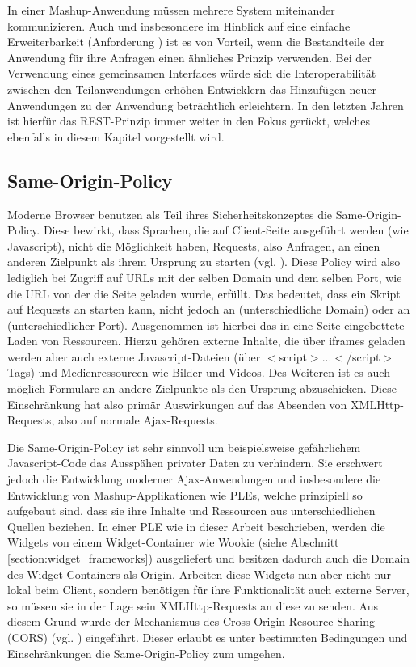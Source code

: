 In einer Mashup-Anwendung müssen mehrere System miteinander kommunizieren. Auch und insbesondere im Hinblick auf eine einfache Erweiterbarkeit (Anforderung ) ist es von Vorteil, wenn die Bestandteile der Anwendung für ihre Anfragen einen ähnliches Prinzip verwenden. Bei der Verwendung eines gemeinsamen Interfaces würde sich die Interoperabilität zwischen den Teilanwendungen erhöhen Entwicklern das Hinzufügen neuer Anwendungen zu der Anwendung beträchtlich erleichtern. In den letzten Jahren ist hierfür das REST-Prinzip immer weiter in den Fokus gerückt, welches ebenfalls in diesem Kapitel vorgestellt wird.
% 
\subsection{Same-Origin-Policy}\label{section:same_origin_policy}
Moderne Browser benutzen als Teil ihres Sicherheitskonzeptes die Same-Origin-Policy. Diese bewirkt, dass Sprachen, die auf Client-Seite ausgeführt werden (wie Javascript), nicht die Möglichkeit haben, Requests, also Anfragen, an einen anderen Zielpunkt als ihrem Ursprung zu starten (vgl. \cite{Ruderman2008}). Diese Policy wird also lediglich bei Zugriff auf URLs mit der selben Domain und dem selben Port, wie die URL von der die Seite geladen wurde, erfüllt. Das bedeutet, dass ein Skript auf  Requests an  starten kann, nicht jedoch an  (unterschiedliche Domain) oder an  (unterschiedlicher Port). Ausgenommen ist hierbei das in eine Seite eingebettete Laden von Ressourcen. Hierzu gehören externe Inhalte, die über iframes geladen werden aber auch externe Javascript-Dateien (über $<$script$>$...$<$/script$>$ Tags) und Medienressourcen wie Bilder und Videos. Des Weiteren ist es auch möglich Formulare an andere Zielpunkte als den Ursprung abzuschicken. Diese Einschränkung hat also primär Auswirkungen auf das Absenden von XMLHttp-Requests, also auf normale Ajax-Requests.

Die Same-Origin-Policy ist sehr sinnvoll um beispielsweise gefährlichem Javascript-Code das Ausspähen privater Daten zu verhindern. Sie erschwert jedoch die Entwicklung moderner Ajax-Anwendungen und insbesondere die Entwicklung von Mashup-Applikationen wie PLEs, welche prinzipiell so aufgebaut sind, dass sie ihre Inhalte und Ressourcen aus unterschiedlichen Quellen beziehen. In einer PLE wie in dieser Arbeit beschrieben, werden die Widgets von einem Widget-Container wie Wookie (siehe Abschnitt \ref{section:widget_frameworks}) ausgeliefert und besitzen dadurch auch die Domain des Widget Containers als Origin. Arbeiten diese Widgets nun aber nicht nur lokal beim Client, sondern benötigen für ihre Funktionalität auch externe Server, so müssen sie in der Lage sein XMLHttp-Requests an diese zu senden. Aus diesem Grund wurde der Mechanismus des Cross-Origin Resource Sharing (CORS) (vgl. \cite{vanKesteren2012}) eingeführt. Dieser erlaubt es unter bestimmten Bedingungen und Einschränkungen die Same-Origin-Policy zum umgehen.


